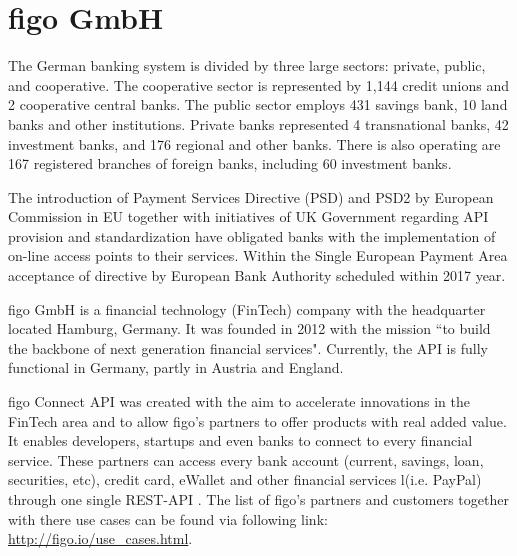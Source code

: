 \chapter{figo GmbH}
The German banking system is divided by three large sectors: private, public, and cooperative. The cooperative sector is represented by 1,144 credit unions and 2 cooperative central banks. The public sector employs 431 savings bank, 10 land banks and other institutions. Private banks represented 4 transnational banks, 42 investment banks, and 176 regional and other banks. There is also operating are 167 registered branches of foreign banks, including 60 investment banks\cite{listOfBanks}.   

The introduction of Payment Services Directive (PSD) and PSD2 by European Commission in EU together with initiatives of UK Government regarding API provision and standardization have obligated banks with the implementation of on-line access points to their services\cite{LarsAPI}\cite{TimAPI}\cite{DaveAPI}. Within the Single European Payment Area acceptance of directive by European Bank Authority scheduled within 2017 year\cite{PSD2}.

figo GmbH is a financial technology (FinTech) company with the headquarter located Hamburg, Germany. It was founded in 2012  with the mission “to build the backbone of next generation financial services"\cite{figoFAQVision}.  Currently, the API is fully functional in Germany, partly in Austria and England\cite{figoAngel}\cite{figoCB}.

figo Connect API was created with the aim to accelerate innovations in the FinTech area and to allow figo's partners to offer products with real added value\cite{figoFAQWhat}. It enables developers, startups and even banks to connect to every financial service. These partners can access every bank account (current, savings, loan, securities, etc), credit card, eWallet and other financial services l(i.e. PayPal) through one single REST-API \cite{figoFAQWhat}\cite{figoFAQVision}\cite{figoFAQPartners}. The list of figo's partners and customers  together with there use cases can be found via following link: \url{http://figo.io/use\_cases.html}.


